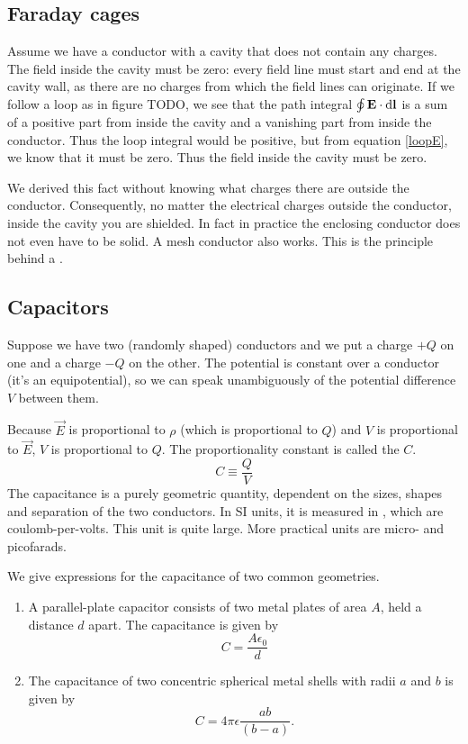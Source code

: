 \subsection{Faraday cages}
Assume we have a conductor with a cavity that does not contain any charges. The field inside the cavity must be zero: every field line must start and end at the cavity wall, as there are no charges from which the field lines can originate. If we follow a loop as in figure TODO, we see that the path integral $\oint \bm{\mathrm{E}}\cdot \operatorname{d \!}{\bm{\mathrm{l}}}$ is a sum of a positive part from inside the cavity and a vanishing part from inside the conductor. Thus the loop integral would be positive, but from equation \eqref{loopE}, we know that it must be zero. Thus the field inside the cavity must be zero.

We derived this fact without knowing what charges there are outside the conductor. Consequently, no matter the electrical charges outside the conductor, inside the cavity you are shielded. In fact in practice the enclosing conductor does not even have to be solid. A mesh conductor also works. This is the principle behind a .

\subsection{Capacitors}
Suppose we have two (randomly shaped) conductors and we put a charge $+Q$ on one and a charge $-Q$ on the other. The potential is constant over a conductor (it's an equipotential), so we can speak unambiguously of the potential difference $V$ between them.

Because $\vec{E}$ is proportional to $\rho$ (which is proportional to $Q$) and $V$ is proportional to $\vec{E}$, $V$ is proportional to $Q$. The proportionality constant is called the  $C$.
\[ C \equiv \frac{Q}{V} \]
The capacitance is a purely geometric quantity, dependent on the sizes, shapes and separation of the two conductors. In SI units, it is measured in , which are coulomb-per-volts. This unit is quite large. More practical units are micro- and picofarads.

We give expressions for the capacitance of two common geometries.
\begin{enumerate}
\item A parallel-plate capacitor consists of two metal plates of area $A$, held a distance $d$ apart. The capacitance is given by
\[ C = \frac{A\epsilon_0}{d} \]
\item The capacitance of two concentric spherical metal shells with radii $a$ and $b$ is given by
\[ C = 4\pi \epsilon \frac{ab}{(b-a)}. \]
\end{enumerate}


